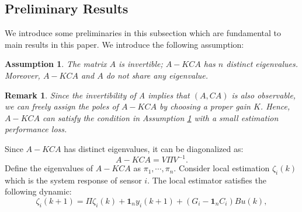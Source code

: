 \documentclass[12pt]{article}  %
\newtheorem{remark}{\textbf{Remark}}
\newtheorem{assumption}{\textbf{Assumption}}
\begin{document}


\subsection{Preliminary Results}\label{sec:preli}
We introduce some preliminaries in this subsection which are fundamental to main results in this paper.
We introduce the following assumption:
\begin{assumption}\label{as:distinct_eigvalue}
	The matrix $A$ is invertible; $A-K C A$ has $n$ distinct eigenvalues. Moreover, $A-K C A$ and $A$ do not share any eigenvalue.
\end{assumption}
\begin{remark}
	Since the invertibility of A implies that $(A, CA)$
is also observable, we can freely assign the poles of $A-KCA$ by choosing a proper gain $K$. Hence, $A-KCA$ can satisfy the condition in Assumption \ref{as:distinct_eigvalue} with a small estimation performance loss.
\end{remark}
Since $A-K C A$ has distinct eigenvalues, it can be diagonalized as:
\begin{equation}\label{eq:VLambda}
	A-K C A=V \Pi V^{-1}.
\end{equation}
Define the eigenvalues of $A-KCA$ as $\pi_{1},\cdots,\pi_{n}$.
Consider local estimation $\zeta_{i}(k)$ which is the system response of sensor $i$. The local estimator satisfies the following dynamic:
\begin{equation}\label{eq:def_zeta}
	\zeta_{i}(k+1)=\Pi \zeta_{i}(k)+\mathbf{1}_{n} y_{i}(k+1)+\left(G_i-\mathbf{1}_n C_i\right)Bu(k) ,
\end{equation}
\end{document}
